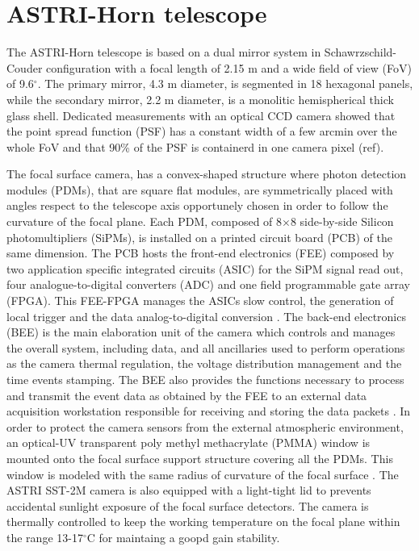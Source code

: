 \section{ASTRI-Horn telescope} 
The ASTRI-Horn telescope is based on a dual mirror system in Schawrzschild-Couder configuration
with a focal length of 2.15 m and a wide field of view (FoV) of 9.6$^\circ$. 
The primary mirror, 4.3 m diameter, is segmented in 18 hexagonal panels, 
while the secondary mirror, 2.2 m diameter, is a monolitic hemispherical thick glass shell. 
Dedicated measurements  with an optical CCD camera showed that the
point spread function (PSF) has a constant width of a few arcmin
over the whole FoV and that  90\% of the PSF  is containerd in one camera pixel (ref). 

The focal surface camera, has a convex-shaped structure where
photon detection modules (PDMs), that are square flat modules, are symmetrically placed
with angles respect to the telescope axis 
opportunely chosen in order to follow the curvature of the focal plane.
Each PDM, composed of 8$\times$8 side-by-side Silicon photomultipliers (SiPMs), 
is installed on a printed circuit board (PCB)  of the same dimension.
The PCB hosts the front-end electronics (FEE) composed by
 two application specific integrated circuits (ASIC) for the SiPM signal read out,
four analogue-to-digital converters (ADC) and one field programmable
gate array (FPGA). This FEE-FPGA manages the ASICs slow control,
the generation of local trigger and the data analog-to-digital conversion \cite{Sottile2016}.
The back-end electronics (BEE) is the main elaboration unit of the camera which
controls and manages the overall system, including data, and
all ancillaries used to perform operations as
the camera thermal regulation, the voltage distribution management and the time events stamping.
The BEE also provides the functions necessary to process and transmit the event data as 
obtained by the FEE to an external data acquisition 
workstation responsible for receiving and storing the data packets \cite{Sottile2016}.
In order to protect the camera sensors from the external
atmospheric environment, an optical-UV transparent poly methyl methacrylate (PMMA)  window 
is mounted onto the focal surface support structure covering all the PDMs.
This window is modeled with the same radius of curvature of the focal surface \cite{Catalano2018}.
The ASTRI SST-2M camera is also equipped  with a light-tight lid to prevents accidental sunlight 
exposure of the focal surface detectors.
The camera is thermally controlled to keep the working temperature on the focal plane within the range 13-17$^\circ$C
for maintaing a goopd gain stability.

